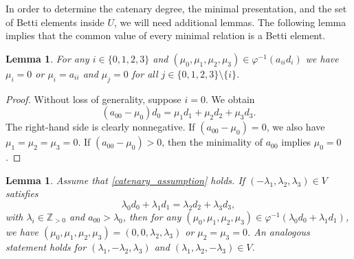 \documentclass[12pt]{article}
\newtheorem{lemma}[thm]{Lemma}
\theoremstyle{remark}
\begin{document}
In order to determine the catenary degree, the minimal presentation, and the set of Betti elements inside $U$, we will need additional lemmas. The following lemma implies that the common value of every minimal relation is a Betti element.


\begin{lemma}\label{lemma_catenary2}
    For any $i \in \{0,1,2,3\}$ and $(\mu_0,\mu_1,\mu_2,\mu_3) \in \varphi^{-1}( a_{ii}d_i)$ we have $\mu_i = 0$ or $\mu_i = a_{ii}$ and $\mu_j = 0$ for all $j \in \{0,1,2,3\} \setminus \{i\}$.
\end{lemma}

\begin{proof}
     Without loss of generality, suppose $i=0$. We obtain
     \begin{equation}\label{lemma_catenary2_eq1}
         (a_{00}-\mu_0)d_0 =  \mu_1d_1 + \mu_2d_2 + \mu_3d_3.
     \end{equation}
     The right-hand side is clearly nonnegative. If $(a_{00}-\mu_0) = 0$, we also have $\mu_1 =\mu_2 =\mu_3 = 0$.  If $(a_{00}-\mu_0) > 0$, then the minimality of $a_{00}$ implies $\mu_0 = 0$.
\end{proof}



\begin{lemma}\label{lemma_catenary3}
    Assume that \eqref{catenary_assumption} holds.  If $(-\lambda_1,\lambda_2,\lambda_3) \in V$ satisfies
    $$ \lambda_0d_0 + \lambda_1d_1 = \lambda_2d_2 + \lambda_3d_3,$$
    with $\lambda_i \in \mathbb{Z}_{>0}$ and $a_{00}>\lambda_0$, then for any $(\mu_0,\mu_1,\mu_2,\mu_3) \in \varphi^{-1}(\lambda_0d_0 + \lambda_1d_1)$, we have $(\mu_0,\mu_1,\mu_2,\mu_3) = (0,0,\lambda_2,\lambda_3)$ or $\mu_2=\mu_3 = 0$. An analogous statement holds for $(\lambda_1,-\lambda_2,\lambda_3)$ and $(\lambda_1,\lambda_2,-\lambda_3) \in V$.
\end{lemma}   
\end{document}
